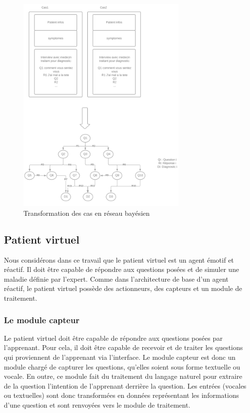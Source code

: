     
    \begin{figure}[H]
        \centering
        \includegraphics[width=0.75\textwidth]{figures/Trans base cas-reseau bayesien.png}
        \captionsetup{justification=centering}
        \caption{Transformation des cas en réseau bayésien}
        \label{fig:4}
    \end{figure}
    
    \subsection{Patient virtuel}
    Nous considérons dans ce travail que le patient virtuel est un agent émotif et réactif. Il doit être capable de répondre aux questions posées et de simuler une maladie définie par l'expert.
    Comme dans l'architecture de base d'un agent réactif, le patient virtuel possède des actionneurs, des capteurs et un module de traitement.
    
    \subsubsection{Le module capteur}
    Le patient virtuel doit être capable de répondre aux questions posées par l'apprenant. Pour cela, il doit être capable de recevoir et de traiter les questions qui proviennent de l'apprenant via l'interface.
    Le module capteur est donc un module chargé de capturer les questions, qu'elles soient sous forme textuelle ou vocale. En outre, ce module fait du traitement du langage naturel pour extraire de la question l'intention de l'apprenant derrière la question. Les entrées (vocales ou textuelles) sont donc transformées en données représentant les informations d'une question et sont renvoyées vers le module de traitement.
    
